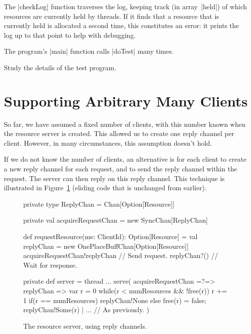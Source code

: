 The |checkLog| function traverses the log, keeping track (in array~|held|) of
which resources are currently held by threads.  If it finds that a resource
that is currently held is allocated a second time, this constitutes an error:
it prints the log up to that point to help with debugging.

The program's |main| function calls |doTest| many times. 

\begin{instruction}
Study the details of the test program.
\end{instruction}


\section{Supporting Arbitrary Many Clients}

So far, we have assumed a fixed number of clients, with this number known when
the resource server is created.  This allowed us to create one reply channel
per client.  However, in many circumstances, this assumption doesn't hold.

If we do not know the number of clients, an alternative is for each client to
create a new reply channel for each request, and to send
the reply channel within the request.  The server can then reply on this reply
channel.
%
This technique is illustrated in Figure~\ref{fig:RAServer-replyChan} (eliding
code that is unchanged from earlier). 


\begin{figure}
\begin{scala}
  private type ReplyChan = Chan[Option[Resource]]

  private val acquireRequestChan = new SyncChan[ReplyChan]

  def requestResource(me: ClientId): Option[Resource] = {
    val replyChan = new OnePlaceBuffChan[Option[Resource]]
    acquireRequestChan!replyChan  // Send request.
    replyChan?() // Wait for response.
  }

  private def server = thread{
    ...
    serve(
      acquireRequestChan =?=> { replyChan => 
	var r = 0
	while(r < numResources && !free(r)) r += 1
	if(r == numResources) replyChan!None
        else{ free(r) = false; replyChan!Some(r) }
      }
      | ... // As previously. 
    )
  }
\end{scala}
\caption{The resource server, using reply channels.}
\label{fig:RAServer-replyChan}
\end{figure}

